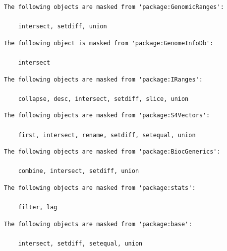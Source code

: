 \documentclass[
  letterpaper,
  DIV=11,
  numbers=noendperiod]{scrartcl}
\newenvironment{Shaded}{\begin{snugshade}}{\end{snugshade}}
\newcommand{\CommentTok}[1]{\textcolor[rgb]{0.37,0.37,0.37}{#1}}
\newcommand{\DecValTok}[1]{\textcolor[rgb]{0.68,0.00,0.00}{#1}}
\newcommand{\FunctionTok}[1]{\textcolor[rgb]{0.28,0.35,0.67}{#1}}
\newcommand{\NormalTok}[1]{\textcolor[rgb]{0.00,0.23,0.31}{#1}}
\newcommand{\OtherTok}[1]{\textcolor[rgb]{0.00,0.23,0.31}{#1}}
\newcommand{\SpecialCharTok}[1]{\textcolor[rgb]{0.37,0.37,0.37}{#1}}
\newcommand{\StringTok}[1]{\textcolor[rgb]{0.13,0.47,0.30}{#1}}
\begin{document}
\begin{verbatim}
The following objects are masked from 'package:GenomicRanges':

    intersect, setdiff, union
\end{verbatim}

\begin{verbatim}
The following object is masked from 'package:GenomeInfoDb':

    intersect
\end{verbatim}

\begin{verbatim}
The following objects are masked from 'package:IRanges':

    collapse, desc, intersect, setdiff, slice, union
\end{verbatim}

\begin{verbatim}
The following objects are masked from 'package:S4Vectors':

    first, intersect, rename, setdiff, setequal, union
\end{verbatim}

\begin{verbatim}
The following objects are masked from 'package:BiocGenerics':

    combine, intersect, setdiff, union
\end{verbatim}

\begin{verbatim}
The following objects are masked from 'package:stats':

    filter, lag
\end{verbatim}

\begin{verbatim}
The following objects are masked from 'package:base':

    intersect, setdiff, setequal, union
\end{verbatim}

\begin{Shaded}
\end{Shaded}
\end{document}
